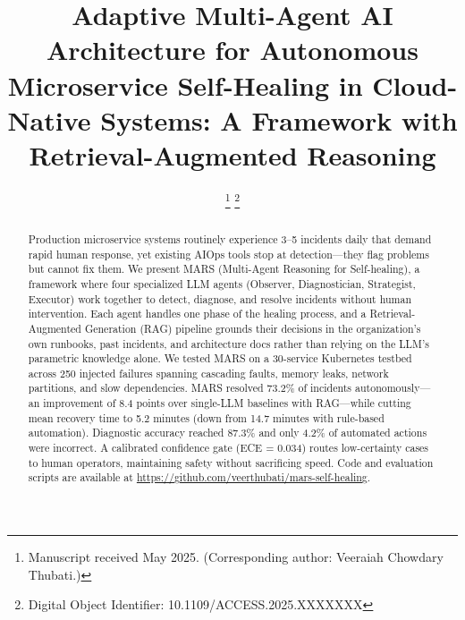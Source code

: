 \documentclass[journal]{IEEEtran}
\begin{document}
\title{Adaptive Multi-Agent AI Architecture for Autonomous Microservice Self-Healing in Cloud-Native Systems: A Framework with Retrieval-Augmented Reasoning}

\author{
\thanks{Manuscript received May 2025. (Corresponding author: Veeraiah Chowdary Thubati.)}
\thanks{Digital Object Identifier: 10.1109/ACCESS.2025.XXXXXXX}
}

\maketitle

\begin{abstract}
Production microservice systems routinely experience 3--5 incidents daily that demand rapid human response, yet existing AIOps tools stop at detection---they flag problems but cannot fix them. We present MARS (Multi-Agent Reasoning for Self-healing), a framework where four specialized LLM agents (Observer, Diagnostician, Strategist, Executor) work together to detect, diagnose, and resolve incidents without human intervention. Each agent handles one phase of the healing process, and a Retrieval-Augmented Generation (RAG) pipeline grounds their decisions in the organization's own runbooks, past incidents, and architecture docs rather than relying on the LLM's parametric knowledge alone. We tested MARS on a 30-service Kubernetes testbed across 250 injected failures spanning cascading faults, memory leaks, network partitions, and slow dependencies. MARS resolved 73.2\% of incidents autonomously---an improvement of 8.4 points over single-LLM baselines with RAG---while cutting mean recovery time to 5.2 minutes (down from 14.7 minutes with rule-based automation). Diagnostic accuracy reached 87.3\% and only 4.2\% of automated actions were incorrect. A calibrated confidence gate (ECE = 0.034) routes low-certainty cases to human operators, maintaining safety without sacrificing speed. Code and evaluation scripts are available at \url{https://github.com/veerthubati/mars-self-healing}.
\end{abstract}
\end{document}
